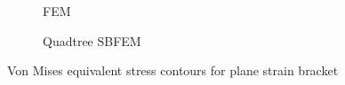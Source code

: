 \begin{figure}[h!]
    \begin{subfigure}[b]{1\linewidth}
        \centering
        \caption{FEM}
    \end{subfigure}
    \begin{subfigure}[b]{1\linewidth}
        \centering
        \caption{Quadtree SBFEM}
    \end{subfigure}

    \caption{Von Mises equivalent stress contours for plane strain bracket}
    \label{qdt_fig:bracket_stress_contour}
\end{figure}
